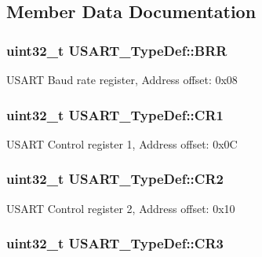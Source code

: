 \subsection{Member Data Documentation}
\hypertarget{struct_u_s_a_r_t___type_def_a6ef06ba9d8dc2dc2a0855766369fa7c9}{
\subsubsection[{B\-R\-R}]{ uint32\-\_\-t U\-S\-A\-R\-T\-\_\-\-Type\-Def\-::\-B\-R\-R}}\label{struct_u_s_a_r_t___type_def_a6ef06ba9d8dc2dc2a0855766369fa7c9}
U\-S\-A\-R\-T Baud rate register, Address offset\-: 0x08 \hypertarget{struct_u_s_a_r_t___type_def_a6d7dcd3972a162627bc3470cbf992ec4}{
\subsubsection[{C\-R1}]{ uint32\-\_\-t U\-S\-A\-R\-T\-\_\-\-Type\-Def\-::\-C\-R1}}\label{struct_u_s_a_r_t___type_def_a6d7dcd3972a162627bc3470cbf992ec4}
U\-S\-A\-R\-T Control register 1, Address offset\-: 0x0\-C \hypertarget{struct_u_s_a_r_t___type_def_aa7ede2de6204c3fc4bd9fb328801c99a}{
\subsubsection[{C\-R2}]{ uint32\-\_\-t U\-S\-A\-R\-T\-\_\-\-Type\-Def\-::\-C\-R2}}\label{struct_u_s_a_r_t___type_def_aa7ede2de6204c3fc4bd9fb328801c99a}
U\-S\-A\-R\-T Control register 2, Address offset\-: 0x10 \hypertarget{struct_u_s_a_r_t___type_def_af2991da9a4e1539530cd6b7b327199cc}{
\subsubsection[{C\-R3}]{ uint32\-\_\-t U\-S\-A\-R\-T\-\_\-\-Type\-Def\-::\-C\-R3}}\label{struct_u_s_a_r_t___type_def_af2991da9a4e1539530cd6b7b327199cc}
